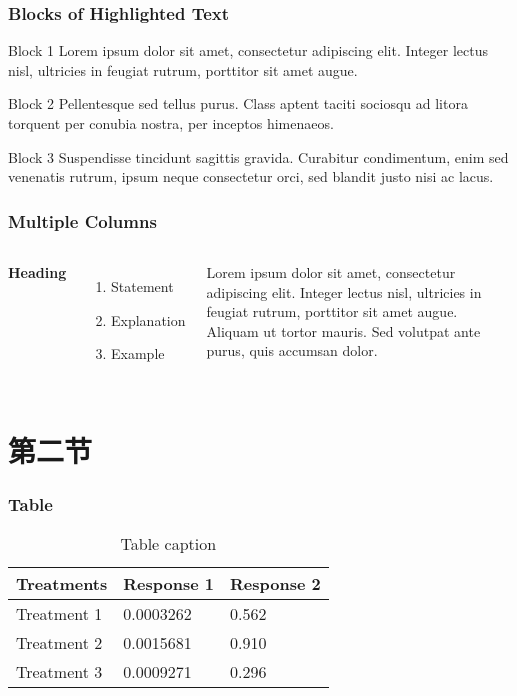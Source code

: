 \documentclass[12pt]{beamer}
\numberwithin{thm}{section}
\numberwithin{defn}{section}
\numberwithin{lmm}{section}
\theoremstyle{example}
\numberwithin{figure}{section}
\numberwithin{table}{section}
\numberwithin{equation}{section}
\begin{document}
\begin{frame}
\frametitle{Blocks of Highlighted Text}
\begin{block}{Block 1}
Lorem ipsum dolor sit amet, consectetur adipiscing elit. Integer lectus nisl, ultricies in feugiat rutrum, porttitor sit amet augue.
\end{block}

\begin{exampleblock}{Block 2}
Pellentesque sed tellus purus. Class aptent taciti sociosqu ad litora torquent per conubia nostra, per inceptos himenaeos.
\end{exampleblock}

\begin{alertblock}{Block 3}
Suspendisse tincidunt sagittis gravida. Curabitur condimentum, enim sed venenatis rutrum, ipsum neque consectetur orci, sed blandit justo nisi ac lacus.
\end{alertblock}
\end{frame}


\begin{frame}
\frametitle{Multiple Columns}
\begin{columns}[c] %

\textbf{Heading}
\begin{enumerate}
\item Statement
\item Explanation
\item Example
\end{enumerate}

Lorem ipsum dolor sit amet, consectetur adipiscing elit. Integer lectus nisl, ultricies in feugiat rutrum, porttitor sit amet augue. Aliquam ut tortor mauris. Sed volutpat ante purus, quis accumsan dolor.

\end{columns}
\end{frame}

\section{第二节}

\begin{frame}
\frametitle{Table}
\begin{table}
\caption{Table caption}
\begin{tabular}{l l l}
\toprule
\textbf{Treatments} & \textbf{Response 1} & \textbf{Response 2}\\
\midrule
Treatment 1 & 0.0003262 & 0.562 \\
Treatment 2 & 0.0015681 & 0.910 \\
Treatment 3 & 0.0009271 & 0.296 \\
\bottomrule
\end{tabular}

\end{table}
\end{frame}
\end{document}
